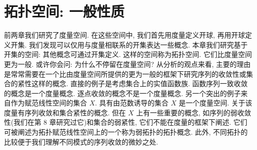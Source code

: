\documentclass[../main.tex]{subfiles}
\begin{document}
\chapter{拓扑空间: 一般性质}\label{chapter:ch11-拓扑空间}

前两章我们研究了度量空间. 在这些空间中, 我们首先用度量定义开球, 再用开球定义开集. 我们发现可以仅用与度量相联系的开集表达一些概念. 本章我们研究基于开集的空间: 其他概念可通过开集定义. 这样的空间称为拓扑空间. 它们比度量空间更为一般. 或许你会问: 为什么不停留在度量空间? 从分析的观点来看, 主要的理由是常常需要在一个比由度量空间所提供的更为一般的框架下研究序列的收敛性或集合的紧性这样的概念. 直接的例子是考虑集合上的实值函数族. 函数序列一致收敛的概念是一个度量概念. 逐点收敛的概念不是一个度量概念. 另一个突出的例子来自作为赋范线性空间的集合 $X$. 具有由范数诱导的集合 $X$ 是一个度量空间. 关于该度量有序列收敛和集合紧性的概念. 但在 $X$ 上有一些重要的概念, 如序列的弱收敛性(我们在第 8 章研究过它)和集合的弱紧性, 它们不能在度量的框架下阐述. 它们可被阐述为拓扑赋范线性空间上的一个称为弱拓扑的拓扑概念. 此外, 不同拓扑的比较便于我们理解不同模式的序列收敛的微妙之处.












\end{document}
